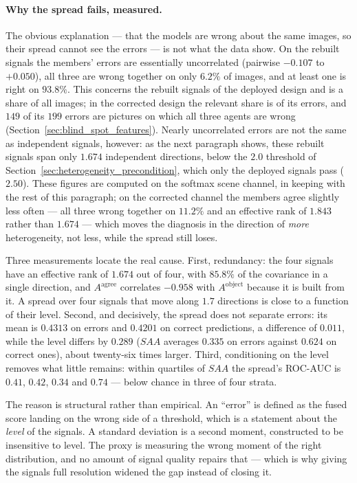 \documentclass[12pt,a4paper]{report}
\begin{document}
\paragraph{Why the spread fails, measured.} The obvious explanation --- that the models are
wrong about the same images, so their spread cannot see the errors --- is not what the data show.
On the rebuilt signals the members' errors are essentially uncorrelated (pairwise $-0.107$ to
$+0.050$), all three are wrong together on only $6.2\%$ of images, and at least one is right on
$93.8\%$. This concerns the rebuilt signals of the deployed design and is a share of all images; in the corrected design the relevant share is of its errors, and $149$ of its $199$ errors are pictures on which all three agents are wrong (Section~\ref{sec:blind_spot_features}). Nearly uncorrelated errors are not the same as independent signals, however: as the next paragraph shows, these rebuilt signals span only $1.674$ independent directions, below the $2.0$ threshold of Section~\ref{sec:heterogeneity_precondition}, which only the deployed signals pass ($2.50$). These figures are computed on the softmax
scene channel, in keeping with the rest of this paragraph; on the corrected channel the
members agree slightly less often --- all three wrong together on $11.2\%$ and an effective
rank of $1.843$ rather than $1.674$ --- which moves the diagnosis in the direction of \emph{more}
heterogeneity, not less, while the spread still loses.

Three measurements locate the real cause. First, redundancy: the four signals have an effective
rank of $\mathbf{1.674}$ out of four, with $85.8\%$ of the covariance in a single direction, and
$A^{\text{agree}}$ correlates $-0.958$ with $A^{\text{object}}$ because it is built from it. A
spread over four signals that move along $1.7$ directions is close to a function of their level.
Second, and decisively, the spread does not separate errors: its mean is $0.4313$ on errors and
$0.4201$ on correct predictions, a difference of $0.011$, while the level differs by $0.289$
($SAA$ averages $0.335$ on errors against $0.624$ on correct ones), about twenty-six times larger.
Third, conditioning on the level removes what little remains: within quartiles of $SAA$ the
spread's ROC-AUC is $0.41$, $0.42$, $0.34$ and $0.74$ --- below chance in three of four strata.

The reason is structural rather than empirical. An ``error'' is defined as the fused score landing
on the wrong side of a threshold, which is a statement about the \emph{level} of the signals. A
standard deviation is a second moment, constructed to be insensitive to level. The proxy is
measuring the wrong moment of the right distribution, and no amount of signal quality repairs
that --- which is why giving the signals full resolution widened the gap instead of closing it.
\end{document}
